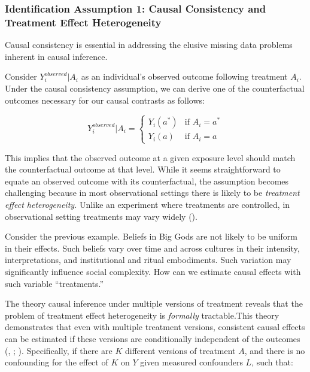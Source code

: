 \documentclass[
  singlecolumn,
  9pt]{article}
\begin{document}
\subsubsection{Identification Assumption 1: Causal Consistency and
Treatment Effect
Heterogeneity}\label{identification-assumption-1-causal-consistency-and-treatment-effect-heterogeneity}

Causal consistency is essential in addressing the elusive missing data
problems inherent in causal inference.

Consider \(Y_i^{observed}|A_i\) as an individual's observed outcome
following treatment \(A_i\). Under the causal consistency assumption, we
can derive one of the counterfactual outcomes necessary for our causal
contrasts as follows:

\[
Y_i^{observed}|A_i = 
\begin{cases} 
Y_i(a^*) & \text{if } A_i = a^* \\
Y_i(a) & \text{if } A_i = a
\end{cases}
\]

This implies that the observed outcome at a given exposure level should
match the counterfactual outcome at that level. While it seems
straightforward to equate an observed outcome with its counterfactual,
the assumption becomes challenging because in most observational
settings there is likely to be \emph{treatment effect heterogeneity.}
Unlike an experiment where treatments are controlled, in observational
setting treatments may vary widely
().

Consider the previous example. Beliefs in Big Gods are not likely to be
uniform in their effects. Such beliefs vary over time and across
cultures in their intensity, interpretations, and institutional and
ritual embodiments. Such variation may significantly influence social
complexity. How can we estimate causal effects with such variable
``treatments.''

The theory causal inference under multiple versions of treatment reveals
that the problem of treatment effect heterogeneity is \emph{formally}
tractable.This theory demonstrates that even with multiple treatment
versions, consistent causal effects can be estimated if these versions
are conditionally independent of the outcomes
(,
;
).
Specifically, if there are \(K\) different versions of treatment \(A\),
and there is no confounding for the effect of \(K\) on \(Y\) given
measured confounders \(L\), such that:
\end{document}
